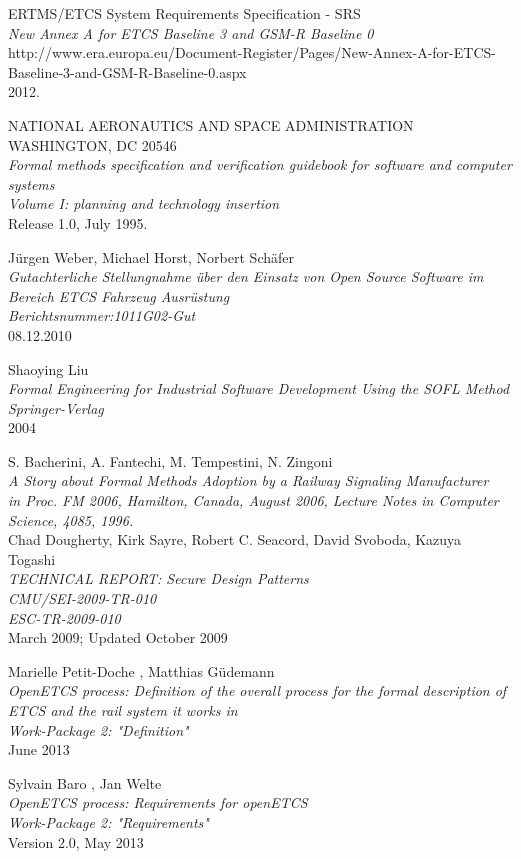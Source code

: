 \documentclass{template/openetcs_report}
\begin{document}
\begin{thebibliography}{99}
  ERTMS/ETCS System Requirements Specification  - SRS\\
  \emph{ New Annex A for ETCS Baseline 3 and GSM-R Baseline 0}\\
  http://www.era.europa.eu/Document-Register/Pages/New-Annex-A-for-ETCS-Baseline-3-and-GSM-R-Baseline-0.aspx\\
  2012.  
  
  
  NATIONAL AERONAUTICS AND SPACE ADMINISTRATION WASHINGTON, DC 20546\\
  \emph{Formal methods specification and verification guidebook for software and computer systems\\
  Volume I: planning and technology insertion}\\
  Release 1.0,
  July 1995.
  
  
  J\"urgen Weber, Michael Horst, Norbert Sch\"afer\\
  \emph{Gutachterliche Stellungnahme über den Einsatz von Open Source Software im Bereich ETCS Fahrzeug Ausrüstung\\
  Berichtsnummer:1011G02-Gut}\\
  08.12.2010
  
  Shaoying Liu\\
  \emph{Formal Engineering for Industrial Software Development Using the  SOFL Method\\
  Springer-Verlag}\\
  2004 
     
  S. Bacherini, A. Fantechi, M. Tempestini, N. Zingoni\\
  \emph{A Story about Formal Methods Adoption by a Railway Signaling Manufacturer\\
  in Proc. FM 2006, Hamilton, Canada, August 2006, Lecture Notes in Computer Science, 4085, 1996.}\\
  
  Chad Dougherty, Kirk Sayre, Robert C. Seacord, David Svoboda, Kazuya Togashi\\
  \emph{TECHNICAL REPORT: Secure Design Patterns\\
  CMU/SEI-2009-TR-010\\ 
  ESC-TR-2009-010}\\
  March 2009; Updated October 2009   
  
  Marielle Petit-Doche , Matthias Güdemann\\
  \emph{OpenETCS process: Definition of the overall process for the formal description of ETCS and the rail system it
  works in\\
  Work-Package 2: "Definition"}\\ 
  June 2013
  
  Sylvain Baro , Jan Welte\\
  \emph{OpenETCS process: Requirements for openETCS\\
  Work-Package 2: "Requirements"}\\ 
  Version 2.0,
  May 2013
\end{thebibliography}








\end{document}
